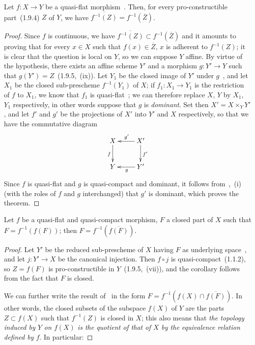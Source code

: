 \begin{theorem}[2.3.10]
\label{IV.2.3.10}
Let $f:X\to Y$ be a quasi-flat morphism~.
Then, for every pro-constructible part~(1.9.4) $Z$ of $Y$, we have $\overline{f^{-1}(Z)}=f^{-1}(\overline{Z})$.
\end{theorem}

\begin{proof}
Since $f$ is continuous, we have $\overline{f^{-1}(Z)}\subset f^{-1}(\overline{Z})$ and it amounts to proving that for every $x\in X$ such that $f(x)\in\overline{Z}$, $x$ is adherent to $f^{-1}(Z)$;
it is clear that the question is local on $Y$, so we can suppose $Y$ affine.
By virtue of the hypothesis, there exists an affine scheme $Y'$ and a morphism $g:Y'\to Y$ such that $g(Y')=Z$~(1.9.5,~(ix)).
Let $Y_1$ be the closed image of $Y'$ under $g$~, and let $X_1$ be the closed sub-prescheme $f^{-1}(Y_1)$ of $X$; if $f_1:X_1\to Y_1$ is the restriction of $f$ to $X_1$, we know that $f_1$ is quasi-flat~; we can therefore replace $X$, $Y$ by $X_1$, $Y_1$ respectively, in other words suppose that $g$ is \emph{dominant}.
Set then $X'=X\times_Y Y'$, and let $f'$ and $g'$ be the projections of $X'$ into $Y'$ and $X$ respectively, so that we have the commutative diagram
\[
\xymatrix{
  X \ar[d]_f & X' \ar[l]_{g'} \ar[d]^{f'} \\
  Y & Y' \ar[l]^g
}
\]
Since $f$ is quasi-flat and $g$ is quasi-compact and dominant, it follows from~,~(i) (with the roles of $f$ and $g$ interchanged) that $g'$ is dominant, which proves the theorem.
\end{proof}

\begin{corollary}[2.3.11]
\label{IV.2.3.11}
Let $f$ be a quasi-flat and quasi-compact morphism, $F$ a closed part of $X$ such that $F=f^{-1}(f(F))$; then $F=f^{-1}(\overline{f(F)})$.
\end{corollary}

\begin{proof}
Let $Y'$ be the reduced sub-prescheme of $X$ having $F$ as underlying space~, and let $j:Y'\to X$ be the canonical injection.
Then $f\circ j$ is quasi-compact~(1.1.2), so $Z=f(F)$ is pro-constructible in $Y$~(1.9.5,~(vii)), and the corollary follows from the fact that $F$ is closed.

We can further write the result of~ in the form $F=f^{-1}(f(X)\cap\overline{f(F)})$.
In other words, the closed subsets of the subspace $f(X)$ of $Y$ are the parts $Z\subset f(X)$ such that $f^{-1}(Z)$ is closed in $X$; this also means that \emph{the topology induced by $Y$ on $f(X)$ is the quotient of that of $X$ by the equivalence relation defined by $f$}.
In particular:
\end{proof}

